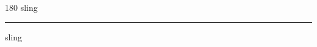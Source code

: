 
\begin{frame}
\begin{center}
\begin{turn}{180}
{\fontsize{2.5cm}{1em}\selectfont sling}
\end{turn}
\vspace{1em}\par  
\hrule
\vspace{1em}\par  
{\fontsize{2.5cm}{1em}\selectfont sling}
\end{center}
\end{frame}
